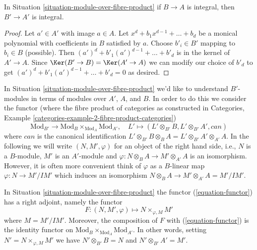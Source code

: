 \begin{lemma}
\label{lemma-fibre-product-integral}
In Situation \ref{situation-module-over-fibre-product}
if $B \to A$ is integral, then $B' \to A'$ is integral.
\end{lemma}

\begin{proof}
Let $a' \in A'$ with image $a \in A$. Let $x^d + b_1 x^{d - 1} + \ldots + b_d$
be a monical polynomial with coefficients in $B$ satisfied by $a$.
Choose $b'_i \in B'$ mapping to $b_i \in B$ (possible).
Then $(a')^d + b'_1 (a')^{d - 1} + \ldots + b'_d$ is in the kernel
of $A' \to A$. Since $\Ker(B' \to B) = \Ker(A' \to A)$ we can
modify our choice of $b'_d$ to get
$(a')^d + b'_1 (a')^{d - 1} + \ldots + b'_d = 0$ as desired.
\end{proof}

\noindent
In Situation \ref{situation-module-over-fibre-product}
we'd like to understand $B'$-modules in terms of modules over $A'$, $A$,
and $B$. In order to do this we consider the functor (where the
fibre product of categories as constructed in
Categories, Example \ref{categories-example-2-fibre-product-categories})
\begin{equation}
\label{equation-functor}
\text{Mod}_{B'} \longrightarrow
\text{Mod}_B \times_{\text{Mod}_A} \text{Mod}_{A'},\quad
L' \longmapsto (L' \otimes_{B'} B, L' \otimes_{B'} A', can)
\end{equation}
where $can$ is the canonical identification
$L' \otimes_{B'} B \otimes_B A = L' \otimes_{B'} A' \otimes_{A'} A$.
In the following we will write $(N, M', \varphi)$ for an object
of the right hand side, i.e., $N$ is a $B$-module, $M'$ is an $A'$-module
and $\varphi : N \otimes_B A \to M' \otimes_{A'} A$ is an isomorphism.
However, it is often more convenient think of $\varphi$ as a $B$-linear
map $\varphi : N \to M'/IM'$ which induces an isomorphism
$N \otimes_B A \to M' \otimes_{A'} A = M'/IM'$.

\begin{lemma}
\label{lemma-module-over-fibre-product}
In Situation \ref{situation-module-over-fibre-product}
the functor (\ref{equation-functor}) has a right adjoint, namely
the functor
$$
F : (N, M', \varphi) \longmapsto N \times_{\varphi, M} M'
$$
where $M = M'/IM'$. Moreover, the composition of $F$ with
(\ref{equation-functor}) is the identity functor on
$\text{Mod}_B \times_{\text{Mod}_A} \text{Mod}_{A'}$. In other words,
setting $N' = N \times_{\varphi, M} M'$ we have
$N' \otimes_{B'} B = N$ and $N' \otimes_{B'} A' = M'$.
\end{lemma}

